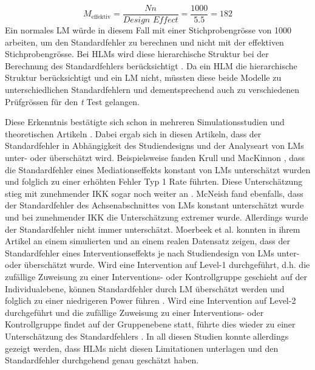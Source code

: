 \documentclass[12pt]{article}\usepackage[]{graphicx}\usepackage[]{color}
\begin{document}
\begin{equation}
M_{\text{effektiv}} = \frac{Nn}{\textit{Design Effect}} = \frac{1000}{5.5} = 182
\end{equation}
Ein normales LM würde in diesem Fall mit einer Stichprobengrösse von 1000 arbeiten, um den Standardfehler zu berechnen und nicht mit der effektiven Stichprobengrösse. Bei HLMs wird diese hierarchische Struktur bei der Berechnung des Standardfehlers berücksichtigt \citep{snijdersbosker1993SEcalc}. Da ein HLM die hierarchische Struktur berücksichtigt und ein LM nicht, müssten diese beide Modelle zu unterschiedlichen Standardfehlern und dementsprechend auch zu verschiedenen Prüfgrössen für den \textit{t} Test gelangen. 

Diese Erkenntnis bestätigte sich schon in mehreren Simulationsstudien und theoretischen Artikeln \citep[z.B.][]{guo2005groupeddatahlm, krullmackinnon2010mediation, mcneish2014analyzing, MOERBEEK2003341}. Dabei ergab sich in diesen Artikeln, dass der Standardfehler in Abhängigkeit des Studiendesigns und der Analyseart von LMs unter- oder überschätzt wird. Beispielsweise fanden Krull und MacKinnon \citeyearpar{krullmackinnon2010mediation}, dass die Standardfehler eines Mediationseffekts konstant von LMs unterschätzt wurden und folglich zu einer erhöhten Fehler Typ 1 Rate führten. Diese Unterschätzung stieg mit zunehmender IKK sogar noch weiter an \citep{krullmackinnon2010mediation}. McNeish \citeyearpar{mcneish2014analyzing} fand ebenfalls, dass der Standardfehler des Achsenabschnittes von LMs konstant unterschätzt wurde und bei zunehmender IKK die Unterschätzung extremer wurde. Allerdings wurde der Standardfehler nicht immer unterschätzt. Moerbeek et al. \citeyearpar{MOERBEEK2003341} konnten in ihrem Artikel an einem simulierten und an einem realen Datensatz zeigen, dass der Standardfehler eines Interventionseffekts je nach Studiendesign von LMs unter- oder überschätzt wurde. Wird eine Intervention auf Level-1 durchgeführt, d.h. die zufällige Zuweisung zu einer Interventions- oder Kontrollgruppe geschieht auf der Individualebene, können Standardfehler durch LM überschätzt werden und folglich zu einer niedrigeren Power führen \citep{MOERBEEK2003341}. Wird eine Intervention auf Level-2 durchgeführt und die zufällige Zuweisung zu einer Interventions- oder Kontrollgruppe findet auf der Gruppenebene statt, führte dies wieder zu einer Unterschätzung des Standardfehlers \citep{MOERBEEK2003341}. In all diesen Studien konnte allerdings gezeigt werden, dass HLMs nicht diesen Limitationen unterlagen und den Standardfehler durchgehend genau geschätzt haben.
\end{document}
